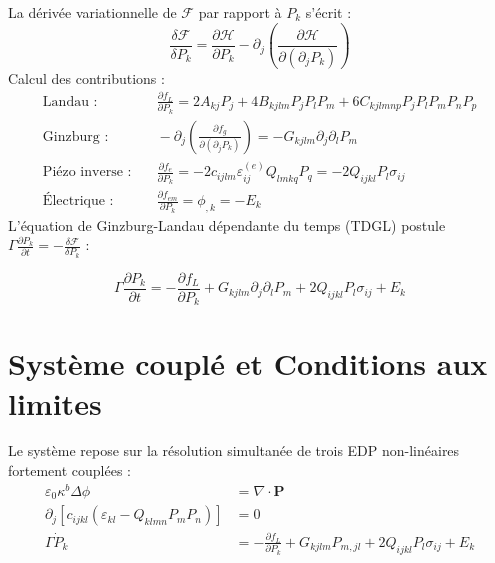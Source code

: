 \documentclass[11pt, a4paper]{article}
\begin{document}
La dérivée variationnelle de $\mathcal{F}$ par rapport à $P_k$ s'écrit :
\begin{equation}
\frac{\delta\mathcal{F}}{\delta P_k} = \frac{\partial\mathcal{H}}{\partial P_k} - \partial_j\left(\frac{\partial\mathcal{H}}{\partial(\partial_j P_k)}\right)
\end{equation}
Calcul des contributions :
\begin{align}
\text{Landau :} &\quad \frac{\partial f_L}{\partial P_k} = 2A_{kj}P_j + 4B_{kjlm}P_jP_lP_m + 6C_{kjlmnp}P_jP_lP_mP_nP_p \\
\text{Ginzburg :} &\quad -\partial_j\left(\frac{\partial f_g}{\partial(\partial_j P_k)}\right) = -G_{kjlm}\partial_j\partial_l P_m \\
\text{Piézo inverse :} &\quad \frac{\partial f_e}{\partial P_k} = -2c_{ijlm}\varepsilon^{(e)}_{ij}Q_{lmkq}P_q = -2Q_{ijkl}P_l\sigma_{ij} \\
\text{Électrique :} &\quad \frac{\partial f_{em}}{\partial P_k} = \phi_{,k} = -E_k
\end{align}
L'équation de Ginzburg-Landau dépendante du temps (TDGL) postule $\Gamma\frac{\partial P_k}{\partial t} = -\frac{\delta\mathcal{F}}{\delta P_k}$ :

\begin{tcolorbox}[title=Équation III — Champ de phase / TDGL (Allen-Cahn ferroélectrique)]
\begin{equation}
\Gamma\frac{\partial P_k}{\partial t} = -\frac{\partial f_L}{\partial P_k} + G_{kjlm}\partial_j\partial_l P_m + 2Q_{ijkl}P_l\sigma_{ij} + E_k
\end{equation}
\end{tcolorbox}

\section{Système couplé et Conditions aux limites}

Le système repose sur la résolution simultanée de trois EDP non-linéaires fortement couplées :
\begin{align}
\varepsilon_0\kappa^b\Delta\phi &= \nabla\cdot\mathbf{P} \\
\partial_j\left[c_{ijkl}\left(\varepsilon_{kl} - Q_{klmn}P_mP_n\right)\right] &= 0 \\
\Gamma\dot{P}_k &= -\frac{\partial f_L}{\partial P_k} + G_{kjlm}P_{m,jl} + 2Q_{ijkl}P_l\sigma_{ij} + E_k
\end{align}
\end{document}
